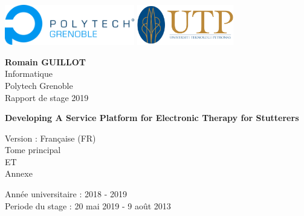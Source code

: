 \begin{titlepage}
    \begin{center}

      \includegraphics[height=1.75cm]{polytech_logo.png}%
      \hfill%
      \hfill%
      \includegraphics[height=1.75cm]{utp_logo.png}%

        \vspace{3cm}

        \large
        \textbf{Romain GUILLOT} \\
        Informatique \\
        Polytech Grenoble \\
        Rapport de stage 2019

        \vspace{2.5cm}

        \huge
        \textbf{Developing A Service Platform for Electronic Therapy for Stutterers}

        \vspace{0.5cm}
        \large Version : Française (FR)\\
        \vspace{2.5cm}
        \large Tome principal \\
        \small ET \\
        \large Annexe


        \vfill

        \large
        Année universitaire : 2018 - 2019\\
        Periode du stage : 20 mai 2019 - 9 août 2013

    \end{center}
\end{titlepage}

